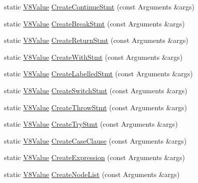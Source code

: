 \begin{DoxyCompactItemize}
\item 
static \hyperlink{namespacemocha_a22eca0d76f439fca2a26cae77eb6ade4}{V8Value} \hyperlink{classmocha_1_1_j_s_ast_a11585b2927c5292aec765eeb04d4d59b}{CreateContinueStmt} (const Arguments \&args)
\item 
static \hyperlink{namespacemocha_a22eca0d76f439fca2a26cae77eb6ade4}{V8Value} \hyperlink{classmocha_1_1_j_s_ast_a5a1d80debda1f28e20f96c1ebcaa717c}{CreateBreakStmt} (const Arguments \&args)
\item 
static \hyperlink{namespacemocha_a22eca0d76f439fca2a26cae77eb6ade4}{V8Value} \hyperlink{classmocha_1_1_j_s_ast_a7c43283a6c6ba95f3ed7075d7882a22e}{CreateReturnStmt} (const Arguments \&args)
\item 
static \hyperlink{namespacemocha_a22eca0d76f439fca2a26cae77eb6ade4}{V8Value} \hyperlink{classmocha_1_1_j_s_ast_a9b0ce45c5c7d4a10c204d99617150c6a}{CreateWithStmt} (const Arguments \&args)
\item 
static \hyperlink{namespacemocha_a22eca0d76f439fca2a26cae77eb6ade4}{V8Value} \hyperlink{classmocha_1_1_j_s_ast_a69cc9a429c1454468787d67fac9bf48e}{CreateLabelledStmt} (const Arguments \&args)
\item 
static \hyperlink{namespacemocha_a22eca0d76f439fca2a26cae77eb6ade4}{V8Value} \hyperlink{classmocha_1_1_j_s_ast_a58ce159a5a0945b13cf7d0c6f3e83a0c}{CreateSwitchStmt} (const Arguments \&args)
\item 
static \hyperlink{namespacemocha_a22eca0d76f439fca2a26cae77eb6ade4}{V8Value} \hyperlink{classmocha_1_1_j_s_ast_a0fb374981a532a4cb83cc3e110031e06}{CreateThrowStmt} (const Arguments \&args)
\item 
static \hyperlink{namespacemocha_a22eca0d76f439fca2a26cae77eb6ade4}{V8Value} \hyperlink{classmocha_1_1_j_s_ast_aa110874b8d6bd79fbb227a7632dba51c}{CreateTryStmt} (const Arguments \&args)
\item 
static \hyperlink{namespacemocha_a22eca0d76f439fca2a26cae77eb6ade4}{V8Value} \hyperlink{classmocha_1_1_j_s_ast_a4f6e513a853036d6a86c575beab66114}{CreateCaseClause} (const Arguments \&args)
\item 
static \hyperlink{namespacemocha_a22eca0d76f439fca2a26cae77eb6ade4}{V8Value} \hyperlink{classmocha_1_1_j_s_ast_a84be580ea587333c52277e4c31c2cdda}{CreateExpression} (const Arguments \&args)
\item 
static \hyperlink{namespacemocha_a22eca0d76f439fca2a26cae77eb6ade4}{V8Value} \hyperlink{classmocha_1_1_j_s_ast_a338135705d945a0a0aa9f60e408a17b4}{CreateNodeList} (const Arguments \&args)
\item 

\end{DoxyCompactItemize}

